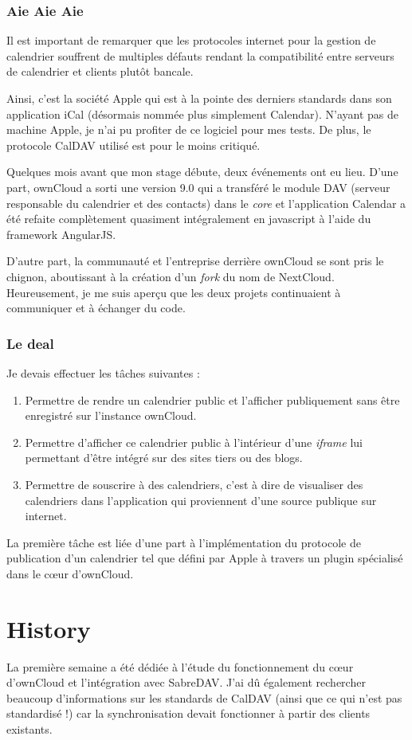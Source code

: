 \documentclass[10pt,a4paper]{report}
\begin{document}
	\subsection{Aie Aie Aie}
	
	Il est important de remarquer que les protocoles internet pour la gestion de calendrier souffrent de multiples défauts rendant la compatibilité entre serveurs de calendrier et clients plutôt bancale.
	
	Ainsi, c'est la société Apple qui est à la pointe des derniers standards dans son application iCal (désormais nommée plus simplement Calendar). N'ayant pas de machine Apple, je n'ai pu profiter de ce logiciel pour mes tests. De plus, le protocole CalDAV utilisé est pour le moins critiqué.
	
	Quelques mois avant que mon stage débute, deux événements ont eu lieu. D'une part, ownCloud a sorti une version 9.0 qui a transféré le module DAV (serveur responsable du calendrier et des contacts) dans le \textit{core} et l'application Calendar a été refaite complètement quasiment intégralement en javascript à l'aide du framework AngularJS.
	
	D'autre part, la communauté et l'entreprise derrière ownCloud se sont pris le chignon, aboutissant à la création d'un \textit{fork} du nom de NextCloud. Heureusement, je me suis aperçu que les deux projets continuaient à communiquer et à échanger du code.
	
	\subsection{Le deal}
	Je devais effectuer les tâches suivantes :
	\begin{enumerate}
		\item Permettre de rendre un calendrier public et l'afficher publiquement sans être enregistré sur l'instance ownCloud.
		\item Permettre d'afficher ce calendrier public à l'intérieur d'une \textit{iframe} lui permettant d'être intégré sur des sites tiers ou des blogs.
		\item Permettre de souscrire à des calendriers, c'est à dire de visualiser des calendriers dans l'application qui proviennent d'une source publique sur internet.
	\end{enumerate}
	La première tâche est liée d'une part à l'implémentation du protocole de publication d'un calendrier tel que défini par Apple à travers un plugin spécialisé dans le cœur d'ownCloud.
	
	\chapter{History}
	La première semaine a été dédiée à l'étude du fonctionnement du cœur d'ownCloud et l'intégration avec SabreDAV. J'ai dû également rechercher beaucoup d'informations sur les standards de CalDAV (ainsi que ce qui n'est pas standardisé !) car la synchronisation devait fonctionner à partir des clients existants.
\end{document}
